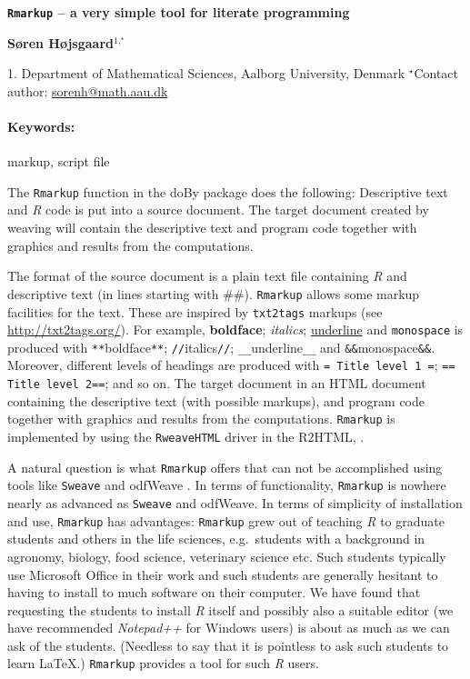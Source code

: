 \documentclass[11pt, a4paper]{article}
\newcommand{\pkg}[1]{{\normalfont\fontseries{b}\selectfont #1}}
\let\proglang=\textit
\let\code=\texttt
\renewcommand{\title}[1]{\begin{center}{\bf \LARGE #1}\end{center}}
\newcommand{\keywords}{\paragraph{Keywords:}}
\begin{document}
\pagestyle{empty}

\title{\code{Rmarkup} -- a very simple tool for literate programming}

\begin{center}
  {\bf S{\o}ren H{\o}jsgaard$^{1,^\star}$}
\end{center}

\begin{affiliations}
1. Department of Mathematical Sciences, Aalborg University, Denmark
$^\star$Contact author: \href{mailto:sorenh@math.aau.dk}{sorenh@math.aau.dk}\\
\end{affiliations}

\keywords markup, script file %

\vskip 0.8cm

The \code{Rmarkup} function in the \pkg{doBy} package does the
following: Descriptive text and \proglang{R} code is put into a source
document. The target document created by weaving will contain the
descriptive text and program code together with graphics and results
from the computations.

The format of the source document is a plain text file containing
\proglang{R} and descriptive text (in lines starting with \#\#).
\code{Rmarkup} allows some markup facilities for the text. These are
inspired by \code{txt2tags} markups (see \url{http://txt2tags.org/}).
For example, {\bf boldface}; {\it italics}; \underline{underline} and
\code{monospace} is produced with \verb'**'boldface\verb'**';
\verb'//'italics\verb'//'; \verb'__'underline\verb'__' and
\verb'&&'monospace\verb'&&'. Moreover, different levels of headings
are produced with 
\verb'= Title level 1 ='; 
\verb'== Title level 2=='; and so on. 
The target document in an HTML
document containing the descriptive text (with possible markups), and
program code together with graphics and results from the computations.
\code{Rmarkup} is implemented by using the
\code{RweaveHTML} driver in the \pkg{R2HTML}, \citep{R2HTML}.


A natural question is what \code{Rmarkup} offers that can not be
accomplished using tools like \code{Sweave} \citep{Sweave} and
\pkg{odfWeave} \citep{odfWeave}. In terms of functionality,
\code{Rmarkup} is nowhere nearly as advanced as  \code{Sweave} and
\pkg{odfWeave}. In terms of simplicity of installation and use,
\code{Rmarkup} has advantages: 
\code{Rmarkup} grew out of teaching \proglang{R} to graduate students
and others in the life sciences, e.g.\ students with a background in
agronomy, biology, food science, veterinary science etc.  Such
students typically use Microsoft Office in their work and such
students are generally hesitant to having to install to much software
on their computer. We have found that requesting the students to
install \proglang{R} itself and possibly also a suitable editor (we
have recommended \proglang{Notepad++} for Windows users) is about as
much as we can ask of the students. (Needless to say that it is
pointless to ask such students to learn \LaTeX.)
\code{Rmarkup} provides a tool for
such \proglang{R} users.
\end{document}
